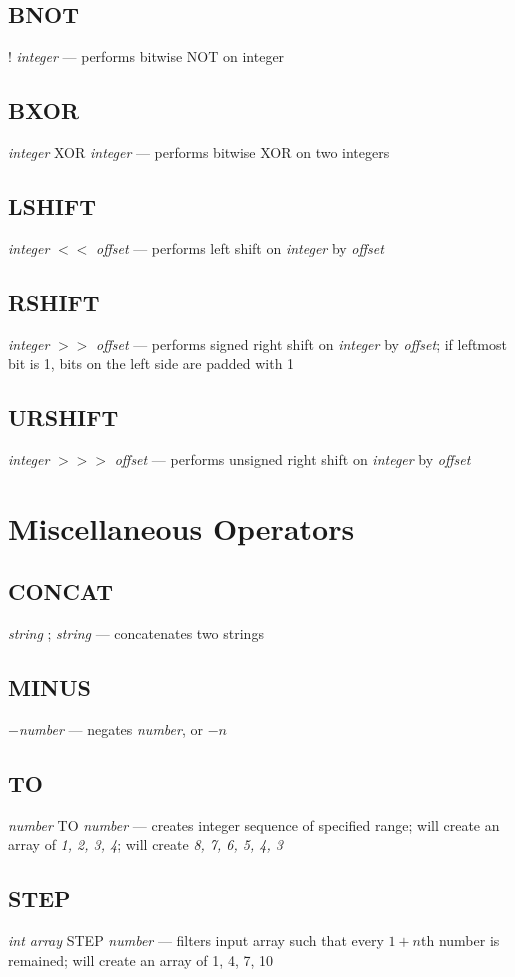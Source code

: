 \subsection{BNOT} ! \emph{integer} --- performs bitwise NOT on integer
\subsection{BXOR} \emph{integer} XOR \emph{integer} --- performs bitwise XOR on two integers
\subsection{LSHIFT} \emph{integer} $<$$<$ \emph{offset} --- performs left shift on \emph{integer} by \emph{offset}
\subsection{RSHIFT} \emph{integer} $>$$>$ \emph{offset} --- performs signed right shift on \emph{integer} by \emph{offset}; if leftmost bit is 1, bits on the left side are padded with 1
\subsection{URSHIFT} \emph{integer} $>$$>$$>$ \emph{offset} --- performs unsigned right shift on \emph{integer} by \emph{offset}


\section{Miscellaneous Operators}

\subsection{CONCAT} \emph{string} ; \emph{string} --- concatenates two strings
\subsection{MINUS} $-$\emph{number} --- negates \emph{number}, or $-n$
\subsection{TO} \emph{number} TO \emph{number} --- creates integer sequence of specified range;  will create an array of \emph{1, 2, 3, 4};  will create \emph{8, 7, 6, 5, 4, 3}
\subsection{STEP} \emph{int array} STEP \emph{number} --- filters input array such that every $1+n$th number is remained;  will create an array of {1, 4, 7, 10}